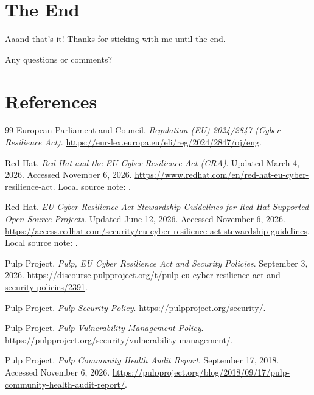 \documentclass[11pt]{article}
\newcommand{\nextslide}{%
  \par\smallskip\noindent\fbox{\textsf{\small Switch slides}}\par\smallskip
}
\begin{document}
\nextslide
\section{The End}
Aaand that's it!
Thanks for sticking with me until the end.

\nextslide
Any questions or comments?
\section{References}
\begin{thebibliography}{99}
  European Parliament and Council. \emph{Regulation (EU) 2024/2847 (Cyber Resilience Act)}.
  \url{https://eur-lex.europa.eu/eli/reg/2024/2847/oj/eng}.

  Red Hat. \emph{Red Hat and the EU Cyber Resilience Act (CRA)}.
  Updated March 4, 2026. Accessed November 6, 2026.
  \url{https://www.redhat.com/en/red-hat-eu-cyber-resilience-act}.
  Local source note: .

  Red Hat. \emph{EU Cyber Resilience Act Stewardship Guidelines for Red Hat
  Supported Open Source Projects}. Updated June 12, 2026. Accessed November 6,
  2026. \url{https://access.redhat.com/security/eu-cyber-resilience-act-stewardship-guidelines}.
  Local source note:
  .

  Pulp Project. \emph{Pulp, EU Cyber Resilience Act and Security Policies}.
  September 3, 2026.
  \url{https://discourse.pulpproject.org/t/pulp-eu-cyber-resilience-act-and-security-policies/2391}.

  Pulp Project. \emph{Pulp Security Policy}.
  \url{https://pulpproject.org/security/}.

  Pulp Project. \emph{Pulp Vulnerability Management Policy}.
  \url{https://pulpproject.org/security/vulnerability-management/}.

  Pulp Project. \emph{Pulp Community Health Audit Report}. September 17, 2018.
  Accessed November 6, 2026.
  \url{https://pulpproject.org/blog/2018/09/17/pulp-community-health-audit-report/}.


\end{thebibliography}
\end{document}
